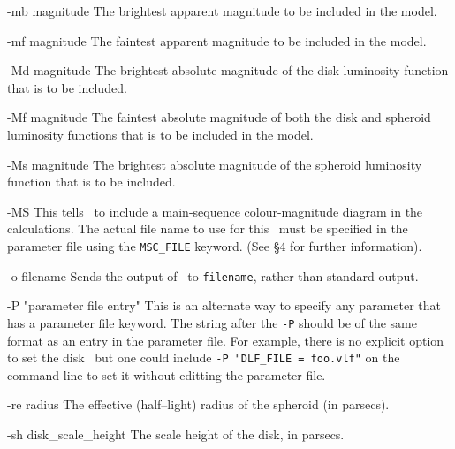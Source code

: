 \begin{clo}{-mb magnitude}
The brightest apparent magnitude to be included in the model.
\end{clo}

\begin{clo}{-mf magnitude}
The faintest apparent magnitude to be included in the model.
\end{clo}

\begin{clo}{-Md magnitude}
The brightest absolute magnitude of the disk luminosity function that is
to be included.
\end{clo}

\begin{clo}{-Mf magnitude}
The faintest absolute magnitude of both the disk and spheroid luminosity
functions that is to be included in the model.
\end{clo}

\begin{clo}{-Ms magnitude}
The brightest absolute magnitude of the spheroid luminosity function that is
to be included.
\end{clo}

\begin{clo}{-MS}
This tells \egm\ to include a main-sequence colour-magnitude diagram in the
calculations. The actual file name to use for this \cmd\ must be specified
in the parameter file using the {\tt MSC\_FILE} keyword. (See \S4 for further 
information).
\end{clo}

\begin{clo}{-o filename}
Sends the output of \egm\ to {\tt filename}, rather than standard output.
\end{clo}

\begin{clo}{-P "parameter file entry"}
This is an alternate way to specify any parameter that has a parameter file
keyword. The string after the {\tt -P} should be of the same format as an 
entry in the parameter file. For example, there is no explicit option to
set the disk \lf\ but one could include {\tt -P "DLF\_FILE = foo.vlf"} on
the command line to set it without editting the parameter file.
\end{clo}

\begin{clo}{-re radius}
The effective (half--light) radius of the spheroid (in parsecs).
\end{clo}

\begin{clo}{-sh disk\_scale\_height}
The scale height of the disk, in parsecs.
\end{clo}

